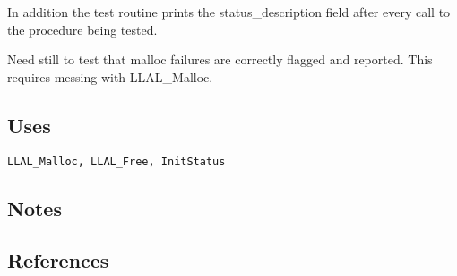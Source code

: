 \documentclass{article}
\begin{document}
In addition the test routine prints the status\_description field after
every call to the procedure being tested. 

Need still to test that malloc failures are correctly flagged and
reported. This requires messing with LLAL\_Malloc.

\subsection{Uses}


{\tt LLAL\_Malloc, LLAL\_Free, InitStatus}

\subsection{Notes}

\subsection{References}

\end{document}
